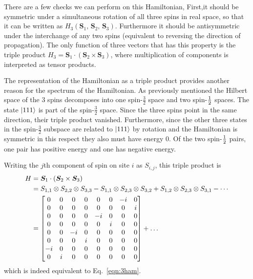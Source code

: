 There are a few checks we can perform on this Hamiltonian, First,it should be symmetric under a simultaneous rotation of all three spins in real space, so that it can be written as $H_3(\bm{S}_1,\,\bm{S}_2 ,\,\bm{S}_3)$. Furthermore it should be antisymmetric under the interchange of any two spins (equivalent to reversing the direction of propagation). The only function of three vectors that has this property is the triple product $H_3= \bm{S}_1\cdot\left(\bm{S}_2 \times\bm{S}_3\right)$, where multiplication of components is interpreted as tensor products.

The representation of the Hamiltonian as a triple product provides another reason for the spectrum of the Hamiltonian. As previously mentioned the Hilbert space of the 3 spins decomposes into one spin-$\frac{3}{2}$ space and two spin-$\frac{1}{2}$ spaces. The state $\left|111\right\rangle$ is part of the spin-$\frac{3}{2}$ space. Since the three spins point in the same direction, their triple product vanished. Furthermore, since the other three states in the spin-$\frac{3}{2}$ subspace are related to $\left|111\right\rangle$ by rotation and the Hamiltonian is symmetric in this respect they also must have energy 0. Of the two spin-$\frac{1}{2}$ pairs, one pair has positive energy and one has negative energy.

Writing the $j$th component of spin on site $i$ as $S_{i,j}$, this triple product is
\begin{align}
H &= \bm{S}_1\cdot\left(\bm{S}_2 \times\bm{S}_3\right) \nonumber\\
&= S_{1,1}\otimes S_{2,2}\otimes{S}_{3,3} - {S}_{1,1}
	\otimes S_{2,3}\otimes S_{3,2} + S_{1,2}\otimes{S}_{2,3} \otimes {S}_{3,1}-\cdots\nonumber\\
&= \begin{bmatrix}
	0 & 0 & 0 & 0 & 0 & 0 &-i & 0 \\
	0 & 0 & 0 & 0 & 0 & 0 & 0 & i \\
	0 & 0 & 0 & 0 &-i & 0 & 0 & 0 \\
	0 & 0 & 0 & 0 & 0 & i & 0 & 0 \\
	0 & 0 &-i & 0 & 0 & 0 & 0 & 0 \\
	0 & 0 & 0 & i & 0 & 0 & 0 & 0 \\
	-i& 0 & 0 & 0 & 0 & 0 & 0 & 0 \\
	0 & i & 0 & 0 & 0 & 0 & 0 & 0
	\end{bmatrix} + \dots
\end{align}
which is indeed equivalent to Eq.~\ref{eqn:3ham}.

